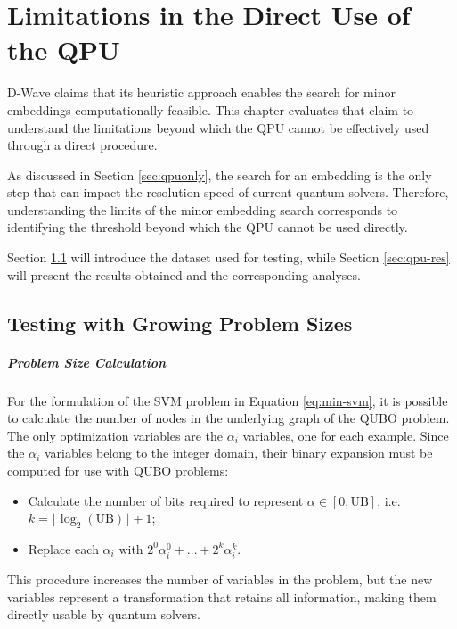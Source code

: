 \chapter{Limitations in the Direct Use of the QPU}

D-Wave claims that its heuristic approach enables the search for minor embeddings computationally feasible. 
This chapter evaluates that claim to understand the limitations beyond which the QPU cannot be effectively used through a direct procedure.

As discussed in Section \ref{sec:qpuonly}, the search for an embedding is the only step that can impact the resolution speed of current quantum solvers. 
Therefore, understanding the limits of the minor embedding search corresponds to identifying the threshold beyond which the QPU cannot be used directly.

Section \ref{sec:qpu-dataset} will introduce the dataset used for testing, while Section \ref{sec:qpu-res} will present the results obtained and the corresponding analyses.

\section{Testing with Growing Problem Sizes}\label{sec:qpu-dataset}

\paragraph{Problem Size Calculation} For the formulation of the SVM problem in Equation \ref{eq:min-svm}, it is possible to calculate the number of nodes in the underlying graph of the QUBO problem. 
The only optimization variables are the $\alpha_i$ variables, one for each example. 
Since the $\alpha_i$ variables belong to the integer domain, their binary expansion must be computed for use with QUBO problems:

\begin{itemize} 
	\item Calculate the number of bits required to represent $\alpha \in [0, \text{UB}]$, i.e. $k = \lfloor\log_2(\text{UB})\rfloor + 1$; 
	\item Replace each $\alpha_i$ with $2^0\alpha_i^0 + \dots + 2^k\alpha_i^k$. 
\end{itemize}

This procedure increases the number of variables in the problem, but the new variables represent a transformation that retains all information, making them directly usable by quantum solvers.

